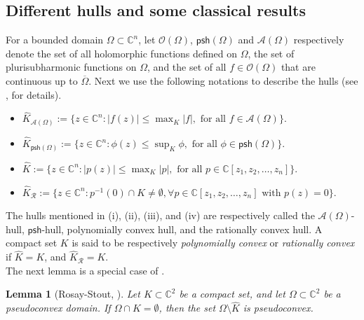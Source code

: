 \documentclass[12pt,reqno, a4paper]{amsart}
\newtheorem{lemma}[theorem]{Lemma}
\theoremstyle{definition}
\theoremstyle{definition}
\numberwithin{equation}{section}
\def\C{\mathbb{C}}                              %
\begin{document}
\subsection{Different hulls and some classical results}
For a bounded domain ${\Omega \subset \C^n}$, let $\mathcal{O}(\Omega)$, $\mathsf{psh}(\Omega)$ and $\mathcal{A}(\Omega)$ respectively denote the set of all holomorphic functions defined on $\Omega$, the set of plurisubharmonic functions on $\Omega$, and the set of all $f\in \mathcal{O}(\Omega)$ that are continuous up to $\overline{\Omega}$. 
Next we use the following notations to describe the hulls (see \cite{jor2}, \cite{stout} for details).
\vspace{.2cm}
\begin{itemize} 
\item [(i)] ${\widehat{K}}_{\mathcal{A}(\Omega)}:=\{z\in\C^n:|f(z)|\leq\max_{K}|f|,  \mbox{ for all } f\in \mathcal{A}(\Omega) \}.$
\item [(ii)] $\widehat{K}_{\mathsf{psh}(\Omega)}:=\{z\in \C^n :\phi(z)\leq \sup_K \phi, \mbox{ for all } {\phi \in \mathsf{psh}(\Omega)}\}.$
\item [(iii)]
$\widehat{K}:=\{z\in\C^n:|p(z)|\leq\max_{K}|p|,\text{ for all } p \in \C[z_1,z_2,\dots, z_n]\}.$
\item [(iv)]  $\widehat{K}_{\mathcal{R}}:=\{z \in \C^n: p^{-1}(0)\cap K\neq \emptyset, \forall p \in \C[z_1,z_2,\dots, z_n] \text{ with } p(z) = 0\}.$
\end{itemize}
\vspace{.2cm}
The hulls mentioned in (i), (ii), (iii), and (iv) are respectively called the {$\mathcal{A}(\Omega)$-hull},  $\mathsf{psh}$-hull, polynomially convex hull, and the rationally convex hull. A compact set $K$ is said to be respectively \textit{polynomially convex} or \textit{rationally convex} if $\widehat{K}=K$, and $\widehat{K}_{\mathcal{R}}=K$. \\

The next lemma is a special case of  \cite[Theorem 2.1, p. 365]{slowd}.

\begin{lemma}[Rosay-Stout, \cite{ros-st}]\label{ros-st}
Let $K \subset \C^2$ be a compact set, and let $\Omega \subset \C^2$ be a pseudoconvex domain. If $\Omega \cap K=\emptyset$, then the set $\Omega \setminus \widehat{K}$ is pseudoconvex.
\end{lemma}
\end{document}
